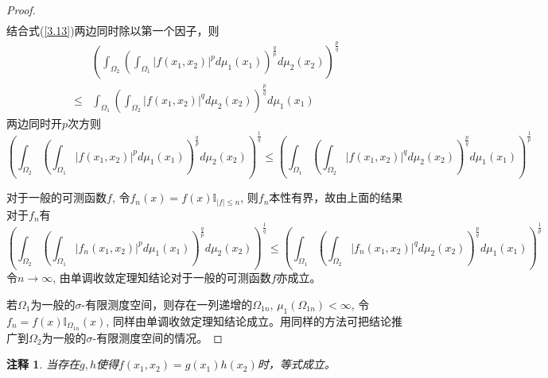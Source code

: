 \documentclass[a4paper,8pt]{ctexart}\textwidth 140mm \textheight 216mm
\newtheorem{Remark}{注释}[section]
\newcommand{\8}{\infty}
\begin{document}
\begin{proof}
\[\begin{split}
	\end{split}
	\]
	结合式(\ref{3.13})两边同时除以第一个因子，则
	\[
	\begin{split}
	&(\int_{\Omega_2}(\int_{\Omega_1}|f(x_1,x_2)|^pd\mu_1(x_1))^{\frac{q}{p}}d\mu_2(x_2))^{\frac{p}{q}}\\
	\leq&\int_{\Omega_1}(\int_{\Omega_2}|f(x_1,x_2)|^qd\mu_2(x_2))^{\frac{p}{q}}d\mu_1(x_1)
	\end{split}
	\]
	两边同时开$p$次方则
	\begin{equation*}
	(\int_{\Omega_2}(\int_{\Omega_1}|f(x_1,x_2)|^pd\mu_1(x_1))^{\frac{q}{p}}d\mu_2(x_2))^{\frac{1}{q}}\leq (\int_{\Omega_1}(\int_{\Omega_2}|f(x_1,x_2)|^qd\mu_2(x_2))^{\frac{p}{q}}d\mu_1(x_1))^{\frac{1}{p}}
	\end{equation*}
	
	对于一般的可测函数$f$, 令$f_n(x)=f(x)\mathbb{I}_{|f|\leq n}$, 则$f_n$本性有界，故由上面的结果对于$f_n$有
	\begin{equation*}
	(\int_{\Omega_2}(\int_{\Omega_1}|f_n(x_1,x_2)|^pd\mu_1(x_1))^{\frac{q}{p}}d\mu_2(x_2))^{\frac{1}{q}}\leq (\int_{\Omega_1}(\int_{\Omega_2}|f_n(x_1,x_2)|^qd\mu_2(x_2))^{\frac{p}{q}}d\mu_1(x_1))^{\frac{1}{p}}
	\end{equation*}
	令$n\to\infty$, 由单调收敛定理知结论对于一般的可测函数$f$亦成立。
	
	若$\Omega_1$为一般的$\sigma$-有限测度空间，则存在一列递增的$\Omega_{1n}$, $\mu_1(\Omega_{1n})<\infty$, 令$f_n=f(x)\mathbb{I}_{\Omega_{1n}}(x)$, 同样由单调收敛定理知结论成立。用同样的方法可把结论推广到$\Omega_2$为一般的$\sigma$-有限测度空间的情况。
\end{proof}
\begin{Remark}
	当存在$g,h$使得$f(x_1,x_2)=g(x_1)h(x_2)$时，等式成立。
\end{Remark}
\end{document}
